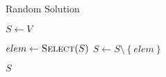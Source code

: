 \begin{algorithm}[h]
  \caption{Random Solution}\label{alg:GENETIKUS-ALGORITMUS:RANDOM-SOLUTION}
  \begin{algorithmic}[1]
    \State $S \leftarrow V$

    \State $elem \leftarrow \Call{Select}{S}$
    \State $S \leftarrow S \setminus \left\{ elem \right\}$
    \EndWhile

    \State \Return $S$
    \EndFunction
  \end{algorithmic}
\end{algorithm}

